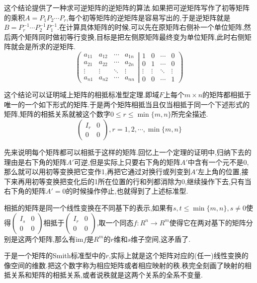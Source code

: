 这个结论提供了一种求可逆矩阵的逆矩阵的算法.如果把可逆矩阵写作了初等矩阵的乘积$A=P_1P_2\cdots P_r$,每个初等矩阵的逆矩阵是容易写出的,于是逆矩阵就是$B=P_r^{-1}\cdots P_2^{-1}P_1^{-1}$.在计算具体矩阵的时候,可以先在原矩阵右侧补一个单位矩阵,然后两个矩阵同时做初等行变换,目标是把左侧原矩阵最终变为单位矩阵,此时右侧矩阵就会是所求的逆矩阵.
$$\left(\left.\begin{array}{cccc}
a_{11}&a_{12}&\cdots&a_{1n}\\
a_{21}&a_{22}&\cdots&a_{2n}\\
\vdots&\vdots&\ddots&\vdots\\
a_{n1}&a_{n2}&\cdots&a_{nn}
\end{array}\right|\begin{array}{cccc}
1&0&\cdots&0\\
0&1&\cdots&0\\
\vdots&\vdots&\ddots&\vdots\\
0&0&\cdots&1
\end{array}\right)$$

这个结论可以证明域上矩阵的相抵标准型定理.即域$F$上每个$m\times n$的矩阵都相抵于唯一的一个如下形式的矩阵.于是两个矩阵相抵当且仅当相抵于同一个下述形式的矩阵,矩阵的相抵关系就被这个数字$0\le r\le\min\{m,n\}$所完全描述.
$$\left(\begin{array}{cc}
I_r&0\\
0&0
\end{array}\right),r=1,2,\cdots,\min\{m,n\}$$

先来说明每个矩阵都可以相抵于这样的矩阵.回忆上一个定理的证明中,归纳下去的理由是右下角的矩阵$A'$可逆,但是实际上只要右下角的矩阵$A'$中含有一个元不是0,那么就可以用初等变换把它变作1,再把它通过对换行或列变到$A'$左上角的位置,接下来再用初等变换把变化后的1所在位置的行和列都消除为0,继续操作下去,只有当右下角的矩阵$A'=0$的时候操作停止,也就得到了上述标准型.

相抵的矩阵是同一个线性变换在不同基下的表示,如果有$s,t\le\min\{m,n\},s\not=0$使得$\left(\begin{array}{cc}
I_s&0\\
0&0
\end{array}\right)$相抵于$\left(\begin{array}{cc}
I_r&0\\
0&0
\end{array}\right)$,取一个同态$f:R^n\to R^m$使得它在两对基下的矩阵分别是这两个矩阵,那么有$\mathrm{im}f$是$R^m$的$r$维和$s$维子空间,这矛盾了.

于是一个矩阵的Smith标准型中的$r$,实际上就是这个矩阵对应的(任一)线性变换的像空间的维数.把这个数字称为相应矩阵或者相应映射的秩.秩完全刻画了映射的相抵关系和矩阵的相抵关系,或者说秩就是这两个关系的全系不变量.

